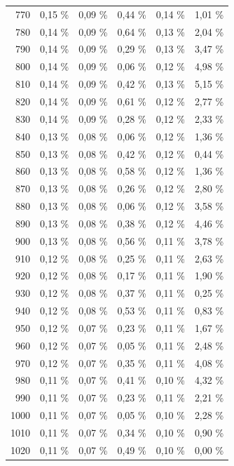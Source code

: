 \documentclass[11pt,twoside,a4paper]{report}
\begin{document}
{\begin{longtable}{rrrrrr}
    770   & 0,15 \% & 0,09 \% & 0,44 \% & 0,14 \% & 1,01 \% \\
    780   & 0,14 \% & 0,09 \% & 0,64 \% & 0,13 \% & 2,04 \% \\
    790   & 0,14 \% & 0,09 \% & 0,29 \% & 0,13 \% & 3,47 \% \\
    800   & 0,14 \% & 0,09 \% & 0,06 \% & 0,12 \% & 4,98 \% \\
    810   & 0,14 \% & 0,09 \% & 0,42 \% & 0,13 \% & 5,15 \% \\
    820   & 0,14 \% & 0,09 \% & 0,61 \% & 0,12 \% & 2,77 \% \\
    830   & 0,14 \% & 0,09 \% & 0,28 \% & 0,12 \% & 2,33 \% \\
    840   & 0,13 \% & 0,08 \% & 0,06 \% & 0,12 \% & 1,36 \% \\
    850   & 0,13 \% & 0,08 \% & 0,42 \% & 0,12 \% & 0,44 \% \\
    860   & 0,13 \% & 0,08 \% & 0,58 \% & 0,12 \% & 1,36 \% \\
    870   & 0,13 \% & 0,08 \% & 0,26 \% & 0,12 \% & 2,80 \% \\
    880   & 0,13 \% & 0,08 \% & 0,06 \% & 0,12 \% & 3,58 \% \\
    890   & 0,13 \% & 0,08 \% & 0,38 \% & 0,12 \% & 4,46 \% \\
    900   & 0,13 \% & 0,08 \% & 0,56 \% & 0,11 \% & 3,78 \% \\
    910   & 0,12 \% & 0,08 \% & 0,25 \% & 0,11 \% & 2,63 \% \\
    920   & 0,12 \% & 0,08 \% & 0,17 \% & 0,11 \% & 1,90 \% \\
    930   & 0,12 \% & 0,08 \% & 0,37 \% & 0,11 \% & 0,25 \% \\
    940   & 0,12 \% & 0,08 \% & 0,53 \% & 0,11 \% & 0,83 \% \\
    950   & 0,12 \% & 0,07 \% & 0,23 \% & 0,11 \% & 1,67 \% \\
    960   & 0,12 \% & 0,07 \% & 0,05 \% & 0,11 \% & 2,48 \% \\
    970   & 0,12 \% & 0,07 \% & 0,35 \% & 0,11 \% & 4,08 \% \\
    980   & 0,11 \% & 0,07 \% & 0,41 \% & 0,10 \% & 4,32 \% \\
    990   & 0,11 \% & 0,07 \% & 0,23 \% & 0,11 \% & 2,21 \% \\
    1000  & 0,11 \% & 0,07 \% & 0,05 \% & 0,10 \% & 2,28 \% \\
    1010  & 0,11 \% & 0,07 \% & 0,34 \% & 0,10 \% & 0,90 \% \\
    1020  & 0,11 \% & 0,07 \% & 0,49 \% & 0,10 \% & 0,00 \% \\
    \bottomrule
    \end{longtable}}%
  \label{tab:Voxel Error}%
\end{document}

